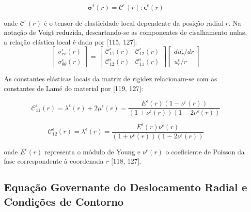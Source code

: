 \begin{equation}
  \mathbf{\sigma}^\epsilon (r) = \mathbf{\mathcal{C}}^\epsilon (r) : \mathbf{\epsilon}^\epsilon (r)
  \label{eq:hooke_tensor_local}
\end{equation}

onde $\mathbf{\mathcal{C}}^\epsilon (r)$ é o tensor de elasticidade local dependente da posição radial $r$. Na notação de Voigt reduzida, descartando-se as componentes de cisalhamento nulas, a relação elástica local é dada por [115, 127]:
\begin{equation}
  \begin{bmatrix}
    \sigma_{rr}^\epsilon (r) \\
    \sigma_{\theta\theta}^\epsilon (r)
  \end{bmatrix} = \begin{bmatrix}
    \mathcal{C}_{11}^\epsilon (r) & \mathcal{C}_{12}^\epsilon (r) \\
    \mathcal{C}_{12}^\epsilon (r) & \mathcal{C}_{11}^\epsilon (r)
  \end{bmatrix} \begin{bmatrix}
    d u_r^\epsilon / d r \\
    u_r^\epsilon / r
  \end{bmatrix}
  \label{eq:voigt_hooke_radial}
\end{equation}

As constantes elásticas locais da matriz de rigidez relacionam-se com as constantes de Lamé do material por [119, 127]:

\begin{equation}
  \mathcal{C}_{11}^\epsilon (r) = \lambda^\epsilon (r) + 2 \mu^\epsilon (r) = \frac{E^\epsilon (r) (1 - \nu^\epsilon (r))}{(1 + \nu^\epsilon (r))(1 - 2 \nu^\epsilon (r))}
  \label{eq:c11_lame}
\end{equation}

\begin{equation}
  \mathcal{C}_{12}^\epsilon (r) = \lambda^\epsilon (r) = \frac{E^\epsilon (r) \nu^\epsilon (r)}{(1 + \nu^\epsilon (r))(1 - 2 \nu^\epsilon (r))}
  \label{eq:c12_lame}
\end{equation}

onde $E^\epsilon (r)$ representa o módulo de Young e $\nu^\epsilon (r)$ o coeficiente de Poisson da fase correspondente à coordenada $r$ [118, 127].

\subsection{Equação Governante do Deslocamento Radial e Condições de Contorno}

